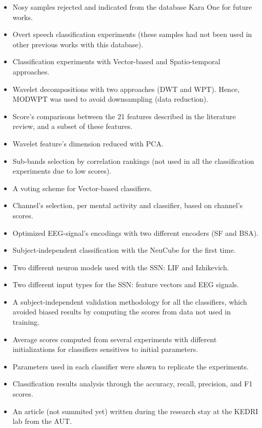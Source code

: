 \begin{itemize}
	\item Nosy samples rejected and indicated from the database Kara One for future works.
	\item Overt speech classification experiments (these samples had not been used in other previous works with this database).
	\item Classification experiments with Vector-based and Spatio-temporal approaches.
	\item Wavelet decompositions with two approaches (DWT and WPT). Hence, MODWPT was used to avoid downsampling (data reduction).
	\item Score's comparisons between the 21 features described in the literature review, and a subset of these features.
	\item Wavelet feature's dimension reduced with PCA.
	\item Sub-bands selection by correlation rankings (not used in all the classification experiments due to low scores).
	\item A voting scheme for Vector-based classifiers.
	\item Channel's selection, per mental activity and classifier, based on channel's scores.
	\item Optimized EEG-signal's encodings with two different encoders (SF and BSA).
	\item Subject-independent classification with the NeuCube for the first time.
	\item Two different neuron models used with the SSN: LIF and Izhikevich.
	\item Two different input types for the SSN: feature vectors and EEG signals.
	\item A subject-independent validation methodology for all the classifiers, which avoided biased results by computing the scores from data not used in training.
	\item Average scores computed from several experiments with different initializations for classifiers sensitives to initial parameters.
	\item Parameters used in each classifier were shown to replicate the experiments.
	\item Classification results analysis through the accuracy, recall, precision, and F1 scores.
	\item An article (not summited yet) written during the research stay at the KEDRI lab from the AUT.
\end{itemize}

